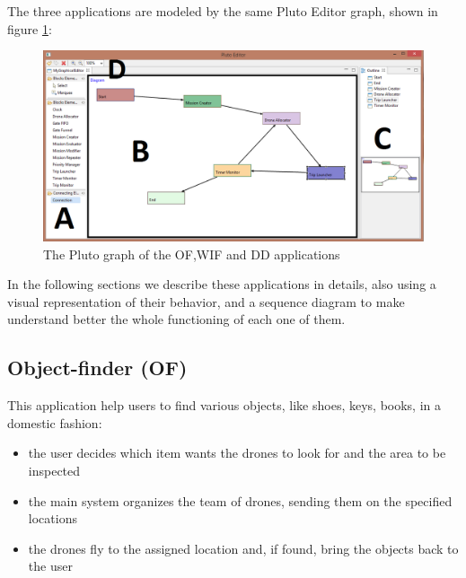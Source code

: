 The three applications are modeled by the same Pluto Editor graph, shown in figure \ref{fig:plutoGraph}:

\begin{figure}[H]
  \centering
  \includegraphics[width=\linewidth]{pictures/EditorScreen.png}
  \caption{The Pluto graph of the OF,WIF and DD applications}
  \label{fig:plutoGraph}
\end{figure}

In the following sections we describe these applications in details, also using a visual representation of their behavior, and a sequence diagram to make understand better the whole functioning of each one of them.

\newpage

\subsection{Object-finder (OF)}

This application help users to find various objects, like shoes, keys, books, in a domestic fashion:

\begin{itemize}
\itemsep2pt
\item{
the user decides which item wants the drones to look for and the area to be inspected
}
\item{
the main system organizes the team of drones, sending them on the specified locations
}
\item{
the drones fly to the assigned location and, if found, bring the objects back to the user
}
\end{itemize}


